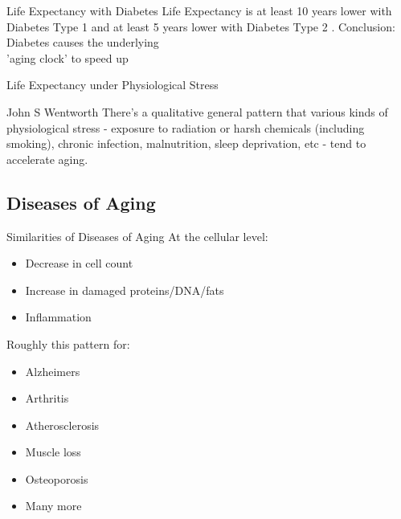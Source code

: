 \begin{frame}[c]{Life Expectancy with Diabetes}
    \large
    Life Expectancy is at least 10 years lower with Diabetes Type 1
    \cite{livingstone2015estimated} and at least 5 years lower with Diabetes Type
    2 \cite{untitled1:online}.
    \newline
    \newline
    \pause
    Conclusion: Diabetes causes the underlying \\ 'aging clock' to speed up
\end{frame}


\begin{frame}[c]{Life Expectancy under Physiological Stress}
    \large
    \begin{aquote}{John S Wentworth \cite{Homeosta76:online}}
    There's a qualitative general pattern that various kinds of physiological
        stress - exposure to radiation or harsh chemicals (including smoking),
        chronic infection, malnutrition, sleep deprivation, etc - tend to
        accelerate aging.
    \end{aquote}
\end{frame}


\subsection{Diseases of Aging}

\begin{frame}[c]{Similarities of Diseases of Aging}
    \large
    \cite{CorePath13:online}
    At the cellular level:
    \begin{itemize}[<+(1)->]
        \item Decrease in cell count
        \item Increase in damaged proteins/DNA/fats
        \item Inflammation
    \end{itemize}
    \pause

    Roughly this pattern for:
    \begin{multicols}{2}
    \begin{itemize}[<+(1)->]
        \item Alzheimers
        \item Arthritis
        \item Atherosclerosis
        \item Muscle loss
        \item Osteoporosis
        \item Many more
    \end{itemize}
    \end{multicols}
\end{frame}

